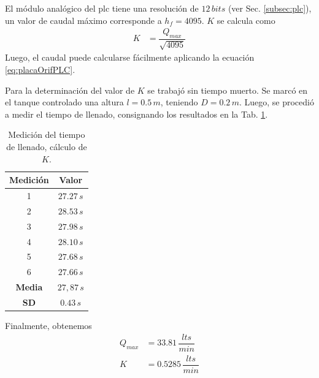 El módulo analógico del \gls{plc} tiene una resolución de $12\,bits$
(ver Sec. \ref{subsec:plc}), un valor de caudal máximo corresponde a $h_f =
4095$.
$K$ se calcula como
\begin{align}
 K &= \dfrac{Q_{max}}{\sqrt{4095}}
\end{align}
Luego, el caudal puede calcularse fácilmente aplicando la ecuación
\eqref{eq:placaOrifPLC}.

Para la determinación del valor de $K$ se trabajó sin tiempo muerto.
Se marcó en el tanque controlado una altura $l=0.5\,m$, teniendo $D=0.2\,m$.
Luego, se procedió a medir el tiempo de llenado, consignando los resultados en
la Tab. \ref{tab:tiempoK}.

\begin{table}[h]
\renewcommand{\arraystretch}{1.3}
  \centering
  \bgroup
  \begin{tabular}{|c|c|}
  \hline
  Medición & Valor\\
  \hline
  1 & $27.27\,s$ \\
  2 & $28.53\,s$ \\
  3 & $27.98\,s$ \\
  4 & $28.10\,s$ \\
  5 & $27.68\,s$ \\
  6 & $27.66\,s$ \\
  \hline
  \hline
  \textbf{Media} & $27,87\,s$\\
  \textbf{SD} & $0.43\,s$\\
  \hline
  \end{tabular}
  \egroup
  \caption{Medición del tiempo de llenado, cálculo de $K$.}
  \label{tab:tiempoK}
\end{table}

Finalmente, obtenemos
\begin{align}
 Q_{max} &= 33.81\,\dfrac{lts}{min}
 \\
 K  &= 0.5285\,\dfrac{lts}{min}
\end{align}

